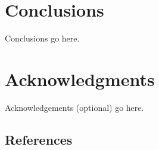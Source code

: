 \documentclass{sig-alternate-05-2015}
\begin{document}



\section{Conclusions}

Conclusions go here.




\section{Acknowledgments}

Acknowledgements (optional) go here.

%

%
%


\subsection{References}
\end{document}
